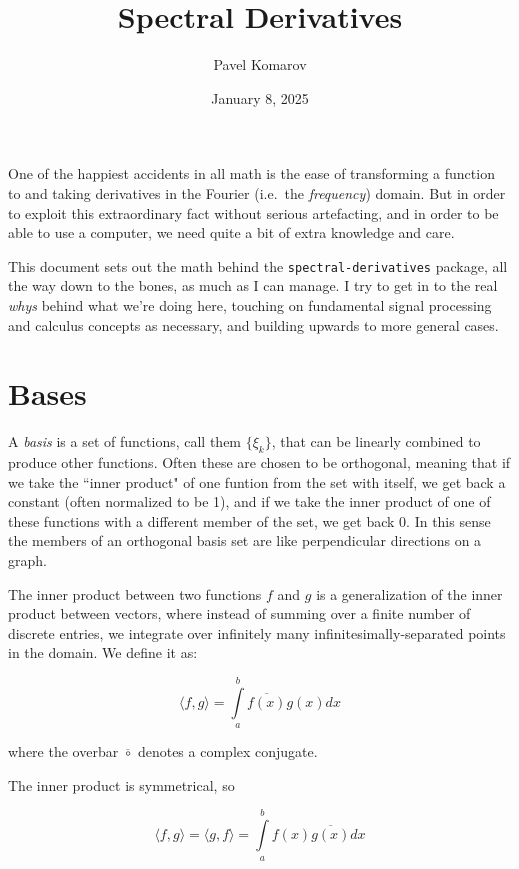 \documentclass[10pt]{article}
\begin{document}
\allowdisplaybreaks

\title{Spectral Derivatives}
\author{Pavel Komarov}
\date{January 8, 2025}
\maketitle

One of the happiest accidents in all math is the ease of transforming a function to and taking derivatives in the Fourier (i.e.~the \textit{frequency}) domain. But in order to exploit this extraordinary fact without serious artefacting, and in order to be able to use a computer, we need quite a bit of extra knowledge and care.

This document sets out the math behind the \texttt{spectral-derivatives} package, all the way down to the bones, as much as I can manage. I try to get in to the real \textit{whys} behind what we're doing here, touching on fundamental signal processing and calculus concepts as necessary, and building upwards to more general cases.

\small
\tableofcontents
\normalsize

\section{Bases}

A \textit{basis} is a set of functions, call them $\{\xi_k\}$, that can be linearly combined to produce other functions. Often these are chosen to be orthogonal, meaning that if we take the ``inner product" of one funtion from the set with itself, we get back a constant (often normalized to be 1), and if we take the inner product of one of these functions with a different member of the set, we get back 0. In this sense the members of an orthogonal basis set are like perpendicular directions on a graph.

The inner product between two functions $f$ and $g$ is a generalization of the inner product between vectors, where instead of summing over a finite number of discrete entries, we integrate over infinitely many infinitesimally-separated points in the domain. We define it as:

$$ \langle f,g \rangle = \int\limits_{a}^{b} \overline{f(x)} g(x) dx $$

\noindent where the overbar $\overline{\circ}$ denotes a complex conjugate.

The inner product is symmetrical, so

$$ \langle f,g \rangle = \langle g,f \rangle = \int\limits_{a}^{b} f(x) \overline{g(x)} dx $$
\end{document}
